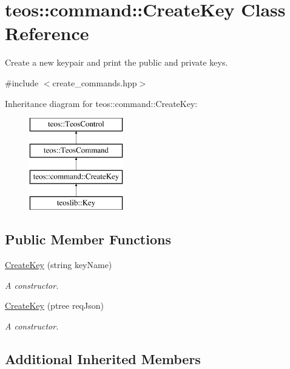 \hypertarget{classteos_1_1command_1_1_create_key}{}\section{teos\+:\+:command\+:\+:Create\+Key Class Reference}
\label{classteos_1_1command_1_1_create_key}


Create a new keypair and print the public and private keys.  




{\ttfamily \#include $<$create\+\_\+commands.\+hpp$>$}

Inheritance diagram for teos\+:\+:command\+:\+:Create\+Key\+:\begin{figure}[H]
\begin{center}
\leavevmode
\includegraphics[height=4.000000cm]{classteos_1_1command_1_1_create_key}
\end{center}
\end{figure}
\subsection*{Public Member Functions}
\begin{DoxyCompactItemize}
\item 
\mbox{\hyperlink{classteos_1_1command_1_1_create_key_a9908b3b01b818ccd742978a0b74c9745}{Create\+Key}} (string key\+Name)
\begin{DoxyCompactList}\small\item\em A constructor. \end{DoxyCompactList}\item 
\mbox{\hyperlink{classteos_1_1command_1_1_create_key_a9e09786f8c0cef5e37d041567627e9fd}{Create\+Key}} (ptree req\+Json)
\begin{DoxyCompactList}\small\item\em A constructor. \end{DoxyCompactList}\end{DoxyCompactItemize}
\subsection*{Additional Inherited Members}


